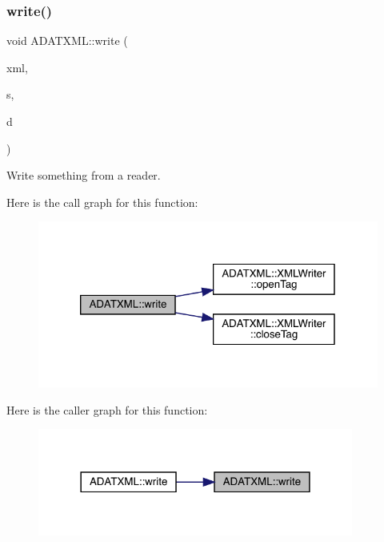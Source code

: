 \subsubsection{\texorpdfstring{write()}{write()}\hspace{0.1cm}{\footnotesize\ttfamily [1/58]}}
{\footnotesize\ttfamily void A\+D\+A\+T\+X\+M\+L\+::write (\begin{DoxyParamCaption}\item[{\mbox{\hyperlink{classADATXML_1_1XMLWriter}{X\+M\+L\+Writer}} \&}]{xml,  }\item[{const std\+::string \&}]{s,  }\item[{const \mbox{\hyperlink{classADATXML_1_1XMLReader}{X\+M\+L\+Reader}} \&}]{d }\end{DoxyParamCaption})}



Write something from a reader. 

Here is the call graph for this function\+:\nopagebreak
\begin{figure}[H]
\begin{center}
\leavevmode
\includegraphics[width=320pt]{d2/da3/group__io_ga0b5b9fff1a99b7e41bb286c7c153ff78_cgraph}
\end{center}
\end{figure}
Here is the caller graph for this function\+:\nopagebreak
\begin{figure}[H]
\begin{center}
\leavevmode
\includegraphics[width=294pt]{d2/da3/group__io_ga0b5b9fff1a99b7e41bb286c7c153ff78_icgraph}
\end{center}
\end{figure}
\mbox{\label{group__io_ga14c568a7a3ffb3e486c9036ff7382f8e}} 
